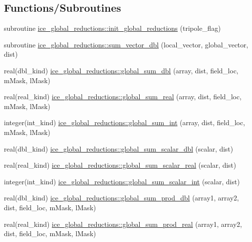 \subsection*{Functions/Subroutines}
\begin{DoxyCompactItemize}
\item 
subroutine \hyperlink{namespaceice__global__reductions_ab9fb73d7096dbb733f5878483a696cf1}{ice\_\-global\_\-reductions::init\_\-global\_\-reductions} (tripole\_\-flag)
\item 
subroutine \hyperlink{namespaceice__global__reductions_adeb296e7d016ecf60a1c72d19d04a868}{ice\_\-global\_\-reductions::sum\_\-vector\_\-dbl} (local\_\-vector, global\_\-vector, dist)
\item 
real(dbl\_\-kind) \hyperlink{namespaceice__global__reductions_a6b1dda84ce2a327ce579b34697eeb79f}{ice\_\-global\_\-reductions::global\_\-sum\_\-dbl} (array, dist, field\_\-loc, mMask, lMask)
\item 
real(real\_\-kind) \hyperlink{namespaceice__global__reductions_a8e8362fe94cfeec02a6fd9ee6ffc6b3f}{ice\_\-global\_\-reductions::global\_\-sum\_\-real} (array, dist, field\_\-loc, mMask, lMask)
\item 
integer(int\_\-kind) \hyperlink{namespaceice__global__reductions_a75c457045df8607362a57112dd907a6d}{ice\_\-global\_\-reductions::global\_\-sum\_\-int} (array, dist, field\_\-loc, mMask, lMask)
\item 
real(dbl\_\-kind) \hyperlink{namespaceice__global__reductions_a019a480688c267b2dfce991d9c8e0d51}{ice\_\-global\_\-reductions::global\_\-sum\_\-scalar\_\-dbl} (scalar, dist)
\item 
real(real\_\-kind) \hyperlink{namespaceice__global__reductions_a909b7495f4cdff7e8d357fa0acdeca74}{ice\_\-global\_\-reductions::global\_\-sum\_\-scalar\_\-real} (scalar, dist)
\item 
integer(int\_\-kind) \hyperlink{namespaceice__global__reductions_a1d53804ee999b9e2c22cfb731f48c5ff}{ice\_\-global\_\-reductions::global\_\-sum\_\-scalar\_\-int} (scalar, dist)
\item 
real(dbl\_\-kind) \hyperlink{namespaceice__global__reductions_aafaab9f2e8ca36d2f081b9e3a0caef2c}{ice\_\-global\_\-reductions::global\_\-sum\_\-prod\_\-dbl} (array1, array2, dist, field\_\-loc, mMask, lMask)
\item 
real(real\_\-kind) \hyperlink{namespaceice__global__reductions_a8ded0a6550ccfe08da739b778ccdadf3}{ice\_\-global\_\-reductions::global\_\-sum\_\-prod\_\-real} (array1, array2, dist, field\_\-loc, mMask, lMask)
\item 

\end{DoxyCompactItemize}
